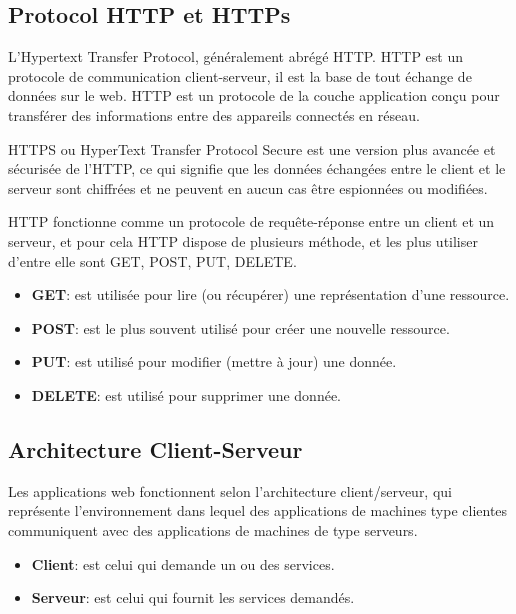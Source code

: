 \subsection{Protocol HTTP et HTTPs }
\par L’Hypertext Transfer Protocol, généralement abrégé HTTP. HTTP est un
protocole de communication client-serveur, il est la base de tout échange de
données sur le web. HTTP est un protocole de la couche application conçu pour
transférer des informations entre des appareils connectés en réseau.
\par HTTPS ou HyperText Transfer Protocol Secure est une version plus avancée
et sécurisée de l’HTTP, ce qui signifie que les données échangées entre le
client et le serveur sont chiffrées et ne peuvent en aucun cas être espionnées
ou modifiées.
\par HTTP fonctionne comme un protocole de requête-réponse entre un client et
un serveur, et pour cela HTTP dispose de plusieurs méthode, et les plus
utiliser d’entre elle sont GET, POST, PUT, DELETE.
\begin{itemize}[label=\textbullet] 
\item \textbf{GET}: est utilisée pour lire (ou récupérer) une représentation
d'une ressource.
\item \textbf{POST}: est le plus souvent utilisé pour créer une nouvelle
ressource.
\item \textbf{PUT}: est utilisé pour modifier (mettre à jour) une donnée.
\item \textbf{DELETE}: est utilisé pour supprimer une donnée.
\end{itemize}
\subsection{Architecture Client-Serveur }
\par Les applications web fonctionnent selon l'architecture client/serveur, qui
représente l’environnement dans lequel des applications de machines type
clientes communiquent avec des applications de machines de type
serveurs.\cite{ref6}
\begin{itemize}[label=\textbullet]
\item \textbf{Client}: est celui qui demande un ou des services.
\item \textbf{Serveur}: est celui qui fournit les services demandés.
\end{itemize}
